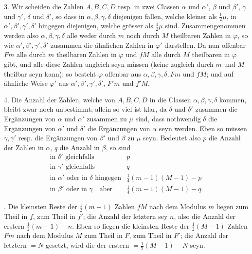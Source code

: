 3. Wir scheiden die Zahlen $A,B,C,D$ resp. in zwei Classen $\alpha$ und $\alpha'$, $\beta$ und $\beta'$, $\gamma$ und $\gamma'$, $\delta$ und $\delta'$, so dass in $\alpha,\beta,\gamma,\delta$ diejenigen fallen, welche kleiner als $\tfrac12\mu$, in $\alpha',\beta',\gamma',\delta'$ hingegen diejenigen, welche grösser als $\tfrac12\mu$ sind. Zusammengenommen werden also $\alpha,\beta,\gamma,\delta$ alle weder durch $m$ noch durch $M$ theilbaren Zahlen in $\varphi$, so wie $\alpha',\beta',\gamma',\delta'$ zusammen die ähnlichen Zahlen in $\varphi'$ darstellen. Da nun offenbar $Fm$ alle durch $m$ theilbaren Zahlen in $\varphi$ und $fM$ alle durch $M$ theilbaren in $\varphi$ gibt, und alle diese Zahlen ungleich seyn müssen (keine zugleich durch $m$ und $M$ theilbar seyn kann); so besteht $\varphi$ offenbar aus $\alpha,\beta,\gamma,\delta,Fm$ und $fM$; und auf ähnliche Weise $\varphi'$ aus $\alpha',\beta',\gamma',\delta'$, $F'm$ und $f'M$.

4. Die Anzahl der Zahlen, welche von $A,B,C,D$ in die Classen $\alpha,\beta,\gamma,\delta$ kommen, bleibt zwar noch unbestimmt; allein so viel ist klar, da $\delta$ und $\delta'$ zusammen die Ergänzungen von $\alpha$ und $\alpha'$ zusammen zu $\mu$ sind, dass nothwendig $\delta$ die Ergänzungen von $\alpha'$ und $\delta'$ die Ergänzungen von $\alpha$ seyn werden. Eben so müssen $\gamma,\gamma'$ resp. die Ergänzungen von $\beta'$ und $\beta$ zu $\mu$ seyn. Bedeutet also $p$ die Anzahl der Zahlen in $\alpha$, $q$ die Anzahl in $\beta$, so sind
\[
\begin{array}{ll}
\text{in }\delta'\text{ gleichfalls}&p\\
\text{in }\gamma'\text{ gleichfalls}&q\\
\text{in }\alpha'\text{ oder in }\delta\text{ hingegen}&\tfrac14(m-1)(M-1)-p\\
\text{in }\beta'\text{ oder in }\gamma\quad\text{aber}&\tfrac14(m-1)(M-1)-q.
\end{array}
\]
\par{}. Die kleinsten Reste der $\tfrac12(m-1)$ Zahlen $fM$ nach dem Modulus $m$ liegen zum Theil in $f$, zum Theil in $f'$; die Anzahl der letztern sey $n$, also die Anzahl der erstern $\tfrac12(m-1)-n$. Eben so liegen die kleinsten Reste der $\tfrac12(M-1)$ Zahlen $Fm$ nach dem Modulus $M$ zum Theil in $F$, zum Theil in $F'$; die Anzahl der letztern $=N$ gesetzt, wird die der erstern $=\tfrac12(M-1)-N$ seyn.
\clearpage

